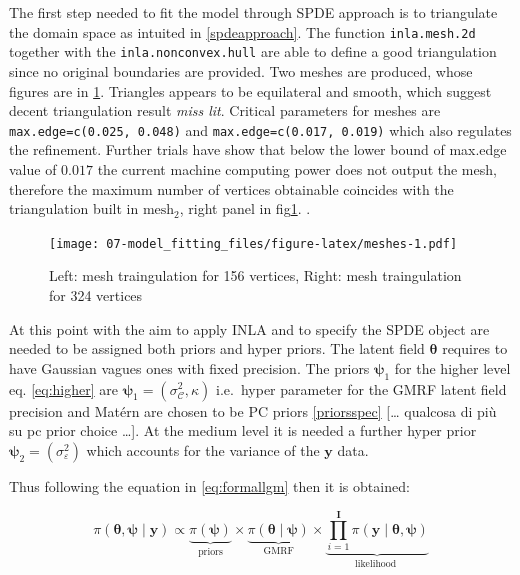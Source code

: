 \documentclass[
  12pt,
  a4paper,
  oneside]{book}
\newcommand{\passthrough}[1]{#1}
\theoremstyle{definition}
\theoremstyle{definition}
\theoremstyle{definition}
\theoremstyle{remark}
\begin{document}
The first step needed to fit the model through SPDE approach is to triangulate the domain space as intuited in \ref{spdeapproach}. The function \passthrough{\lstinline!inla.mesh.2d!} together with the \passthrough{\lstinline!inla.nonconvex.hull!} are able to define a good triangulation since no original boundaries are provided. Two meshes are produced, whose figures are in \ref{fig:meshes}. Triangles appears to be equilateral and smooth, which suggest decent triangulation result \emph{miss lit}. Critical parameters for meshes are \passthrough{\lstinline!max.edge=c(0.025, 0.048)!} and \passthrough{\lstinline!max.edge=c(0.017, 0.019)!} which also regulates the refinement. Further trials have show that below the lower bound of max.edge value of \(0.017\) the current machine computing power does not output the mesh, therefore the maximum number of vertices obtainable coincides with the triangulation built in \(\text{mesh}_2\), right panel in fig\ref{fig:meshes}. .

\begin{figure}
\centering
\texttt{[image: 07-model\_fitting\_files/figure-latex/meshes-1.pdf]}
\caption{\label{fig:meshes}Left: mesh traingulation for 156 vertices, Right: mesh traingulation for 324 vertices}
\end{figure}

At this point with the aim to apply INLA and to specify the SPDE object are needed to be assigned both priors and hyper priors. The latent field \(\boldsymbol\theta\) requires to have Gaussian vagues ones with fixed precision. The priors \(\boldsymbol\psi_1\) for the higher level eq. \eqref{eq:higher} are \(\boldsymbol\psi_1 = \left(\sigma_{\mathscr{C}}^{2}, \kappa\right)\) i.e.~hyper parameter for the GMRF latent field precision and Matérn are chosen to be PC priors \ref{priorsspec} {[}\ldots{} qualcosa di più su pc prior choice \ldots{]}. At the medium level it is needed a further hyper prior \(\boldsymbol\psi_2 = (\sigma_{\varepsilon}^{2})\) which accounts for the variance of the \(\boldsymbol{y}\) data.

Thus following the equation in \eqref{eq:formallgm} then it is obtained:

\[
\pi(\boldsymbol{\theta}, \boldsymbol{\psi} \mid \mathbf{y})\propto  \underbrace{\pi(\boldsymbol{\psi})}_{\text {priors}} \times \underbrace{\pi(\boldsymbol\theta \mid \boldsymbol\psi)}_{\text {GMRF}} \times \underbrace{\prod_{i=1}^{\mathbf{I}} \pi\left(\mathbf{y} \mid \boldsymbol\theta, \boldsymbol{\psi}\right)}_{\text {likelihood }}
\]
\end{document}
